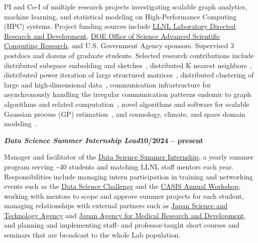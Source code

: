 \begin{outerlist}
  \vspace{-0.5em}

  PI and Co-I of multiple research projects investigating scalable graph
  analytics, machine learning, and statistical modeling on High-Performance
  Computing (HPC) systems.
  Project funding sources include
  \href{https://st.llnl.gov/research/internal-investments/ldrd}{LLNL Laboratory Directed Research and Development},
  \href{https://science.osti.gov/ascr}{DOE Office of Science Advanced Scientific Computing Research}, and U.S. Government Agency sponsors.
  Supervised 3 postdocs and dozens of graduate students.
  Selected research contributions include distributed subspace embedding and sketches~\cite{priest2020scaling,krowkee}, distributed K nearest neighbors~\cite{saltatlas,iwabuchi2024neo,iwabuchi2023towards,iwabuchi2026solanet}, distributed power iteration of large structured matrices~\cite{powersqueeze}, distributed clustering of large and high-dimensional data~\cite{clams}, communication infrastructure for asynchronously handling the irregular communication patterns endemic to graph algorithms and related computation~\cite{steil2023embracing,ygm}, novel algorithms and software for scalable Gaussian process (GP) estimation~\cite{muyskens2021muygps,muygpys}, and cosmology, climate, and space domain modeling~\cite{muyskens2022star}.

  \vspace{-0.5em}

  \item[] \textbf{\textit{Data Science Summer Internship Lead}}\hfill \textbf{10/2024 -- present}

  \vspace{-0.5em}

  Manager and facilitator of the
  \href{https://data-science.llnl.gov/dssi}{Data Science Summer Internship},
  a yearly summer program serving \textasciitilde{}40 students and matching LLNL staff mentors each year.
  Responsibilities include managing intern participation in training and networking events such as the
  \href{https://data-science.llnl.gov/dsc}{Data Science Challenge} and the
  \href{https://engineering.llnl.gov/centers/casis/workshops}{CASIS Annual Workshop}, working with mentors to scope and approve summer projects for each student, managing relationships with external partners such as
  \href{https://www.jst.go.jp/EN/}{Japan Science and Technology Agency} and
  \href{https://www.amed.go.jp/en/}{Japan Agency for Medical Research and Development},
  and planning and implementing staff- and professor-taught short courses and seminars that are broadcast to the whole Lab population.


\end{outerlist}
